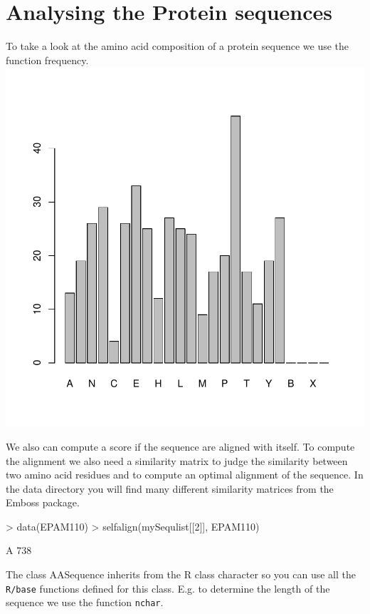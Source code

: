 \documentclass{article}
\begin{document}
\section{Analysing the Protein sequences}

To take a look at the amino acid composition of a protein sequence we use the function frequency.
\includegraphics{SamplesSession-PlotAAFreq}

We also can compute a score if the sequence are aligned with itself.
To compute the alignment we also need a similarity matrix to judge the similarity between two amino acid residues and to compute an optimal alignment of the sequence. In the data directory you will find many different similarity matrices from the Emboss package.

\begin{Schunk}
\begin{Sinput}
> data(EPAM110)
> selfalign(mySequlist[[2]], EPAM110)
\end{Sinput}
\begin{Soutput}
  A 
738 
\end{Soutput}
\end{Schunk}

The class AASequence inherits from the R class character so you can use all the \texttt{R/base} functions defined for this class. E.g. to determine the length of the sequence we use the function \texttt{nchar}.
\end{document}
